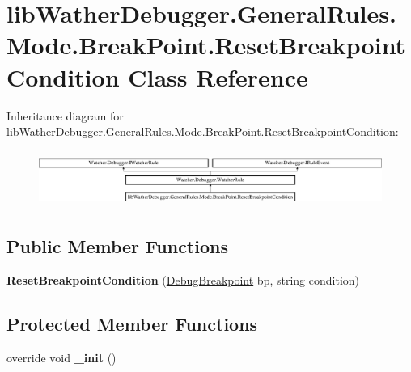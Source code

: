 \hypertarget{classlib_wather_debugger_1_1_general_rules_1_1_mode_1_1_break_point_1_1_reset_breakpoint_condition}{\section{lib\+Wather\+Debugger.\+General\+Rules.\+Mode.\+Break\+Point.\+Reset\+Breakpoint\+Condition Class Reference}
\label{classlib_wather_debugger_1_1_general_rules_1_1_mode_1_1_break_point_1_1_reset_breakpoint_condition}
}
Inheritance diagram for lib\+Wather\+Debugger.\+General\+Rules.\+Mode.\+Break\+Point.\+Reset\+Breakpoint\+Condition\+:\begin{figure}[H]
\begin{center}
\leavevmode
\includegraphics[height=1.834061cm]{classlib_wather_debugger_1_1_general_rules_1_1_mode_1_1_break_point_1_1_reset_breakpoint_condition}
\end{center}
\end{figure}
\subsection*{Public Member Functions}
\begin{DoxyCompactItemize}
\item 
\hypertarget{classlib_wather_debugger_1_1_general_rules_1_1_mode_1_1_break_point_1_1_reset_breakpoint_condition_a3434f3abcd31226d10509f88410126f3}{{\bfseries Reset\+Breakpoint\+Condition} (\hyperlink{classlib_wather_debugger_1_1_breakpoint_1_1_debug_breakpoint}{Debug\+Breakpoint} bp, string condition)}\label{classlib_wather_debugger_1_1_general_rules_1_1_mode_1_1_break_point_1_1_reset_breakpoint_condition_a3434f3abcd31226d10509f88410126f3}

\end{DoxyCompactItemize}
\subsection*{Protected Member Functions}
\begin{DoxyCompactItemize}
\item 
\hypertarget{classlib_wather_debugger_1_1_general_rules_1_1_mode_1_1_break_point_1_1_reset_breakpoint_condition_ace6485a02f4d4911b3be548fd962d5d9}{override void {\bfseries \+\_\+init} ()}\label{classlib_wather_debugger_1_1_general_rules_1_1_mode_1_1_break_point_1_1_reset_breakpoint_condition_ace6485a02f4d4911b3be548fd962d5d9}

\end{DoxyCompactItemize}
